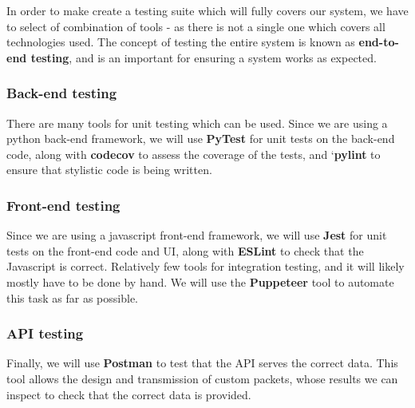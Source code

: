 \documentclass[10pt]{article}
\begin{document}
In order to make create a testing suite which will fully covers our system, we
have to select of combination of tools - as there is not a single one which
covers all technologies used. The concept of testing the entire system is known
as \textbf{end-to-end testing}, and is an important for ensuring a system works
as expected.

\subsubsection{Back-end testing}
There are many tools for unit testing which can be used. Since we are using a
python back-end framework, we will use \textbf{PyTest} \cite{Pytest} for unit
tests on the back-end code, along with \textbf{codecov} \cite{Codecov} to assess
the coverage of the tests, and `\textbf{pylint} \cite{Pylint} to ensure that
stylistic code is being written.

\subsubsection{Front-end testing}
Since we are using a javascript front-end framework, we will use \textbf{Jest}
\cite{Jest} for unit tests on the front-end code and UI, along with
\textbf{ESLint} \cite{ESLint} to check that the Javascript is correct.
Relatively few tools for integration testing, and it will likely mostly have to
be done by hand. We will use the \textbf{Puppeteer} \cite{Puppeteer} tool to
automate this task as far as possible.

\subsubsection{API testing}
Finally, we will use \textbf{Postman} \cite{Postman} to test that the API serves
the correct data. This tool allows the design and transmission of custom
packets, whose results we can inspect to check that the correct data is
provided.

\pagebreak

\nocite{*}


\end{document}
